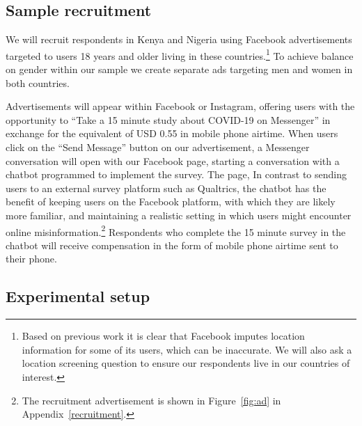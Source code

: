 \documentclass[letterpaper, 12pt, parskip=full,DIV=12]{scrartcl}
\begin{document}
\subsection{Sample recruitment}
We will recruit respondents in Kenya and Nigeria using Facebook advertisements targeted to users 18 years and older living in these countries.\footnote{Based on previous work it is clear that Facebook imputes location information for some of its users, which can be inaccurate. We will also ask a location screening question to ensure our respondents live in our countries of interest.} To achieve balance on gender within our sample we create separate ads targeting men and women in both countries. 


Advertisements will appear within Facebook or Instagram, offering users with the opportunity to ``Take a 15 minute study about COVID-19 on Messenger'' in exchange for the equivalent of USD 0.55 in mobile phone airtime. When users click on the ``Send Message'' button on our advertisement, a Messenger conversation will open with our Facebook page, starting a conversation with a chatbot programmed to implement the survey. The page, In contrast to sending users to an external survey platform such as Qualtrics, the chatbot has the benefit of keeping users on the Facebook platform, with which they are likely more familiar, and maintaining a realistic setting in which users might encounter online misinformation.\footnote{The recruitment advertisement is shown in Figure~\ref{fig:ad} in Appendix~\ref{recruitment}. \color{red}{[[Add images of chatbot once linked to page]]}} Respondents who complete the 15 minute survey in the chatbot will receive compensation in the form of mobile phone airtime sent to their phone. %

\subsection{Experimental setup}
\end{document}
